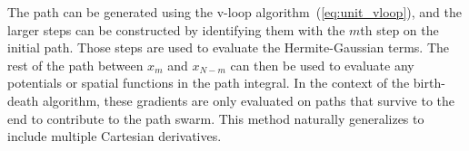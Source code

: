 The path can be generated using the v-loop algorithm~(\ref{eq:unit_vloop}), and the larger 
steps can be constructed by identifying them with the $m$th step on the initial path.  Those
steps are used to evaluate the Hermite-Gaussian terms.   
The rest of the path between $x_m$ and $x_{N-m}$ can then be used to evaluate any potentials or spatial
functions in the path integral.  
In the context of the birth-death algorithm, these gradients are only evaluated on paths that survive 
to the end to contribute to the path swarm.  
This method naturally generalizes to include multiple Cartesian derivatives.  





